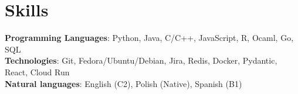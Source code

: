 \documentclass[letterpaper,11pt]{article}
\begin{document}
\section{Skills}
\begin{itemize}[leftmargin=0.15in, label={}]
	\small{\item{
		            \textbf{Programming Languages}{: Python, Java, C/C++, JavaScript, R,  Ocaml, Go, SQL} \\
		            \textbf{Technologies}{: Git, Fedora/Ubuntu/Debian, Jira, Redis, Docker, Pydantic, React, Cloud Run} \\
		            \textbf{Natural languages}{: English (C2), Polish (Native), Spanish (B1) } \\
		      }}
\end{itemize}
\vspace{-16pt}
\end{document}
